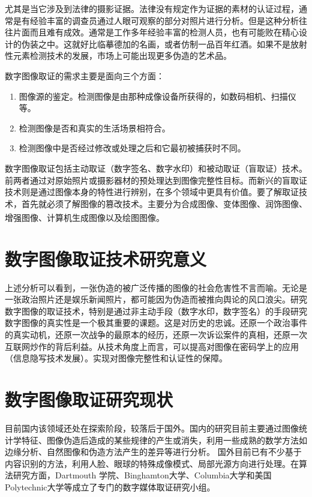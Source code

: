 \documentclass[a4paper, 10pt, notitlepage]{report}
\newcommand{\supercite}[1]{\textsuperscript{\cite{#1}}}
\begin{document}
		尤其是当它涉及到法律的摄影证据。法律没有规定作为证据的素材的认证过程，通常是有经验丰富的调查员通过人眼可观察的部分对照片进行分析。但是这种分析往往片面而且难有成效。通常是工作多年经验丰富的检测人员，也有可能败在精心设计的伪装之中。这就好比临摹德加的名画，或者仿制一品百年红酒。如果不是放射性元素检测技术的发展，市场上可能出现更多伪造的艺术品。

		数字图像取证的需求主要是面向三个方面：
		\begin{enumerate}\setlength{\itemsep}{-0.1cm}
			\item 图像源的鉴定。检测图像是由那种成像设备所获得的，如数码相机、扫描仪等。
			\item 检测图像是否和真实的生活场景相符合。
			\item 检测图像中是否经过修改或处理之后和它最初被捕获时不同。
		\end{enumerate}

		数字图像取证包括主动取证（数字签名、数字水印）和被动取证（盲取证）技术。前两者通过对原始照片或摄影器材的预处理达到图像完整性目标。而新兴的盲取证技术则是通过图像本身的特性进行辨别，在多个领域中更具有价值。要了解取证技术，首先就必须了解图像的篡改技术。主要分为合成图像、变体图像、润饰图像、增强图像、计算机生成图像以及绘图图像\supercite{summary01}。

	\section{数字图像取证技术研究意义}
		上述分析可以看到，一张伪造的被广泛传播的图像的社会危害性不言而喻。无论是一张政治照片还是娱乐新闻照片，都可能因为伪造而被推向舆论的风口浪尖。研究数字图像的取证技术，特别是通过非主动手段（数字水印，数字签名）的手段研究数字图像的真实性是一个极其重要的课题。这是对历史的忠诚。还原一个政治事件的真实动机，还原一次战争的最原本的经历，还原一次诉讼案件的真相，还原一次互联网炒作的背后利益。从技术角度上而言，可以提高对图像在密码学上的应用（信息隐写技术发展）。实现对图像完整性和认证性的保障。

	\section{数字图像取证研究现状}
		目前国内该领域还处在探索阶段，较落后于国外。国内的研究目前主要通过图像统计学特征、图像伪造后造成的某些规律的产生或消失，利用一些成熟的数学方法如边缘分析、自然图像和伪造方法产生的差异等进行分析。
	国外目前已有不少基于内容识别的方法，利用人脸、眼球的特殊成像模式、局部光源方向进行处理。在算法研究方面，Dartmouth 学院、Binghamton大学、Columbia大学和美国Polytechnic大学等成立了专门的数字媒体取证研究小组。
	
\end{document}
